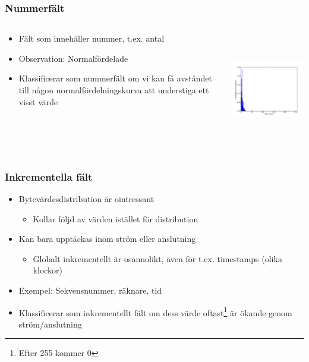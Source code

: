 \documentclass[xetex, 8pt]{beamer}
\begin{document}
    \begin{frame}
        \frametitle{Nummerfält}
        \begin{columns}[t]
            \begin{column}[T]{6cm}
                \begin{itemize}
                    \item Fält som innehåller nummer, t.ex. antal
                    \item Observation: Normalfördelade
                    \item Klassificerar som nummerfält om vi kan få avståndet
                        till någon normalfördelningskurva att understiga ett
                        visst värde
                \end{itemize}
            \end{column}
            \begin{column}[T]{6cm}
                \includegraphics[height=5cm]{img/number.pdf}
            \end{column}
        \end{columns}
    \end{frame}
    \begin{frame}
        \frametitle{Inkrementella fält}
        \begin{itemize}
            \item Bytevärdesdistribution är ointressant
                \begin{itemize}
                    \item Kollar följd av värden istället för distribution
                \end{itemize}
            \item Kan bara upptäckas inom ström eller anslutning
                \begin{itemize}
                    \item Globalt inkrementellt är osannolikt, även för t.ex. timestamps (olika klockor)
                \end{itemize}
            \item Exempel: Sekvensnummer, räknare, tid
            \item Klassificerar som inkrementellt fält om dess värde
                oftast\footnote{Efter 255 kommer 0} är ökande genom
                ström/anslutning
        \end{itemize}
    \end{frame}
\end{document}
